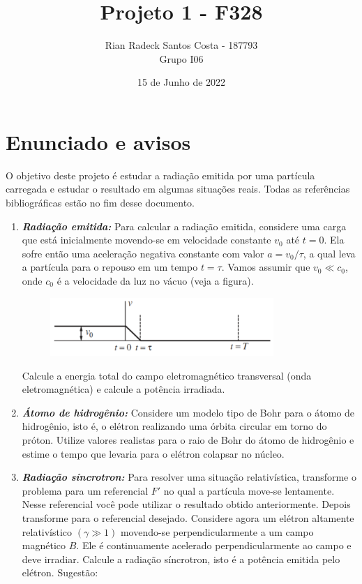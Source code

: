 \documentclass[12pt, letterpaper]{article}
\title{Projeto 1 - F328}
\author{Rian Radeck Santos Costa - 187793 \\ Grupo I06}
\date{15 de Junho de 2022}
\begin{document}
\maketitle
\newpage
\tableofcontents
\newpage

\section{Enunciado e avisos}
    O objetivo deste projeto é estudar a radiação emitida por uma partícula carregada e estudar o resultado em algumas situações reais. Todas as referências bibliográficas estão no fim desse documento.

    \begin{enumerate}
        \item \textbf{\textit{Radiação emitida:}} Para calcular a radiação emitida, considere uma carga que está inicialmente movendo-se em velocidade constante $v_0$ até $t = 0$. Ela sofre então uma aceleração negativa constante com valor $a = v_0/\tau$, a qual leva a partícula para o repouso em um tempo $t = \tau$. Vamos assumir que $v_0 \ll c_0$, onde $c_0$ é a velocidade da luz no vácuo (veja a figura).

        \begin{figure}[h]
            \centering
            \includegraphics[width=0.8\textwidth]{start}
            \label{fig:fig0}
        \end{figure}

        Calcule a energia total do campo eletromagnético transversal (onda eletromagnética) e calcule a potência irradiada.

        \item \textbf{\textit{Átomo de hidrogênio:}} Considere um modelo tipo de Bohr para o átomo de hidrogênio, isto é, o elétron realizando uma órbita circular em torno do próton. Utilize valores realistas para o raio de Bohr do átomo de hidrogênio e estime o tempo que levaria para o elétron colapsar no núcleo.

        \item \textbf{\textit{Radiação síncrotron:}} Para resolver uma situação relativística, transforme o problema para um    referencial $F'$ no qual a partícula move-se lentamente. Nesse referencial você pode utilizar o resultado obtido anteriormente. Depois transforme para o referencial desejado. Considere agora um elétron altamente relativístico $(\gamma \gg 1)$ movendo-se perpendicularmente a um campo magnético $B$. Ele é continuamente acelerado perpendicularmente ao campo e deve irradiar. Calcule a radiação síncrotron, isto é a potência emitida pelo elétron. Sugestão: 


\end{enumerate}
\end{document}
